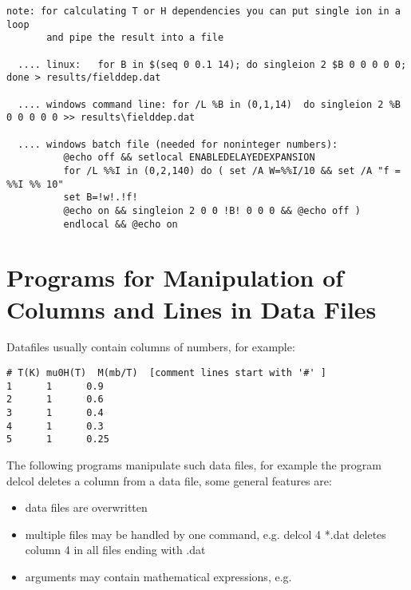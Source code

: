 \begin{description}
\begin{verbatim}
note: for calculating T or H dependencies you can put single ion in a loop
       and pipe the result into a file

  .... linux:   for B in $(seq 0 0.1 14); do singleion 2 $B 0 0 0 0 0; done > results/fielddep.dat

  .... windows command line: for /L %B in (0,1,14)  do singleion 2 %B 0 0 0 0 0 >> results\fielddep.dat

  .... windows batch file (needed for noninteger numbers):
          @echo off && setlocal ENABLEDELAYEDEXPANSION
          for /L %%I in (0,2,140) do ( set /A W=%%I/10 && set /A "f = %%I %% 10"
          set B=!w!.!f!
          @echo on && singleion 2 0 0 !B! 0 0 0 && @echo off )
          endlocal && @echo on 
\end{verbatim}      
\end{description} 

\section{Programs for Manipulation of Columns and Lines in Data Files}

Datafiles usually contain columns of numbers, for example:

\begin{verbatim}
# T(K) mu0H(T)  M(mb/T)  [comment lines start with '#' ]
1      1      0.9
2      1      0.6
3      1      0.4
4      1      0.3
5      1      0.25
\end{verbatim}

The following programs manipulate such data files, for example
the program {\prg delcol} deletes a column from a data file,
some general features are:
\begin{itemize}
\item data files are overwritten 
\item multiple files may be handled by one command, e.g. {\prg delcol 4 *.dat} deletes column 4
in all 
files ending with .dat
\item arguments may contain mathematical expressions, e.g. 
\end{itemize}

